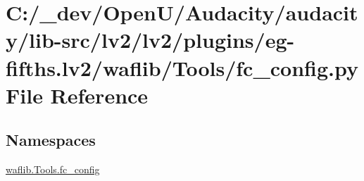 \hypertarget{lv2_2plugins_2eg-fifths_8lv2_2waflib_2_tools_2fc__config_8py}{}\section{C\+:/\+\_\+dev/\+Open\+U/\+Audacity/audacity/lib-\/src/lv2/lv2/plugins/eg-\/fifths.lv2/waflib/\+Tools/fc\+\_\+config.py File Reference}
\label{lv2_2plugins_2eg-fifths_8lv2_2waflib_2_tools_2fc__config_8py}
\subsection*{Namespaces}
\begin{DoxyCompactItemize}
\item 
 \hyperlink{namespacewaflib_1_1_tools_1_1fc__config}{waflib.\+Tools.\+fc\+\_\+config}
\end{DoxyCompactItemize}
